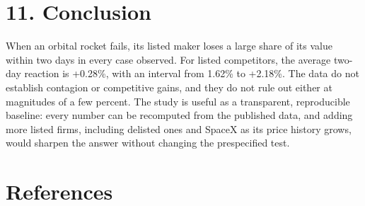 \documentclass[12pt,a4paper]{article}
\begin{document}
\section*{11. Conclusion}
When an orbital rocket fails, its listed maker loses a large share of its value within two days in every case observed. For listed competitors, the average two-day reaction is +0.28\%, with an interval from \textminus{}1.62\% to +2.18\%. The data do not establish contagion or competitive gains, and they do not rule out either at magnitudes of a few percent. The study is useful as a transparent, reproducible baseline: every number can be recomputed from the published data, and adding more listed firms, including delisted ones and SpaceX as its price history grows, would sharpen the answer without changing the prespecified test.

\section*{References}
\end{document}
